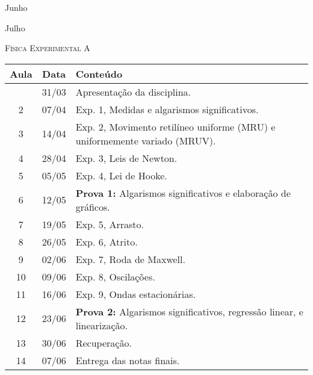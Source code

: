 %
\begin{marginfigure}
    \centering
    Junho\\
\end{marginfigure} %
%
\begin{marginfigure}
    \centering
    Julho\\
\end{marginfigure} %
%
\vspace{1cm}
\begin{center}
\Large\textsc{Física Experimental A}
\end{center}

\begin{center}
\begin{longtable}{ccp{70mm}}
\toprule
Aula & Data & Conteúdo \\
\midrule
\endhead
\bottomrule
\endfoot
  1 & 31/03 & Apresentação da disciplina. \\
  2 & 07/04 & Exp. 1, Medidas e algarismos significativos. \\
  3 & 14/04 & Exp. 2, Movimento retilíneo uniforme (MRU) e uniformemente variado (MRUV). \\
  4 & 28/04 & Exp. 3, Leis de Newton. \\
  5 & 05/05 & Exp. 4, Lei de Hooke. \\
  6 & 12/05 & \textbf{Prova 1:} Algarismos significativos e elaboração de gráficos. \\
  7 & 19/05 & Exp. 5, Arrasto. \\
  8 & 26/05 & Exp. 6, Atrito. \\
  9 & 02/06 & Exp. 7, Roda de Maxwell. \\
 10 & 09/06 & Exp. 8, Oscilações. \\
 11 & 16/06 & Exp. 9, Ondas estacionárias. \\
 12 & 23/06 & \textbf{Prova 2:} Algarismos significativos, regressão linear, e linearização. \\
 13 & 30/06 & Recuperação.\\
 14 & 07/06 & Entrega das notas finais.
\end{longtable}
\end{center}


\cleardoublepage
